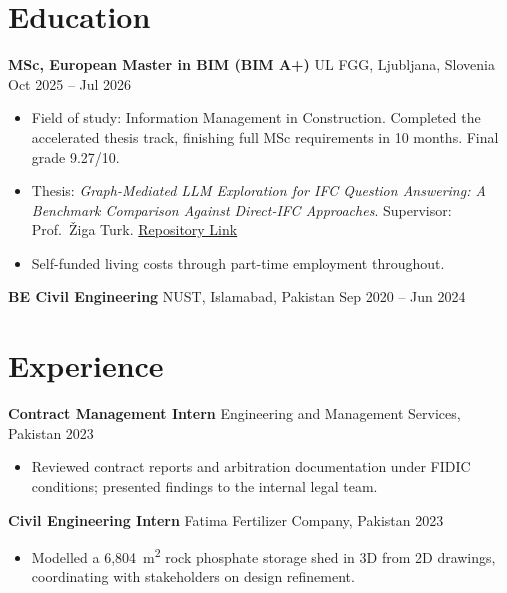 \documentclass[a4paper,10.5pt]{article}
\newcommand{\datefill}{\dotfill}
\newcommand{\entry}[3]{\vspace{2.5pt}\noindent\textbf{#1} \textbar{} #2 \datefill{} #3\par\vspace{0.5pt}}
\begin{document}
\section{Education}
\entry{MSc, European Master in BIM (BIM A+)}{UL FGG, Ljubljana, Slovenia}{Oct 2025 -- Jul 2026}
\begin{itemize}
  \item Field of study: Information Management in Construction. Completed the
        accelerated thesis track, finishing full MSc requirements in 10 months.
        Final grade 9.27/10.
  \item Thesis: \textit{Graph-Mediated LLM Exploration for IFC Question Answering:
        A Benchmark Comparison Against Direct-IFC Approaches}. Supervisor:
        Prof.~\v{Z}iga Turk. \href{https://repozitorij.uni-lj.si/IzpisGradiva.php?id=185169&lang=eng}{Repository Link}
  \item Self-funded living costs through part-time employment throughout.
\end{itemize}

\entry{BE Civil Engineering}{NUST, Islamabad, Pakistan}{Sep 2020 -- Jun 2024}

\section{Experience}
\entry{Contract Management Intern}{Engineering and Management Services, Pakistan}{ 2023}
\begin{itemize}
  \item Reviewed contract reports and arbitration documentation under FIDIC
        conditions; presented findings to the internal legal team.
\end{itemize}

\entry{Civil Engineering Intern}{Fatima Fertilizer Company, Pakistan}{ 2023}
\begin{itemize}
  \item Modelled a 6,804~m\textsuperscript{2} rock phosphate storage shed in 3D from
        2D drawings, coordinating with stakeholders on design refinement.
\end{itemize}
\end{document}
